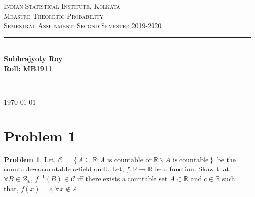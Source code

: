 \documentclass[12pt]{article}
\newcommand{\R}{\mathbb{R}}
\newcommand{\HRule}{\rule{\linewidth}{0.5mm}} %
\theoremstyle{definition}
\newtheorem*{prb}{Problem}
\newenvironment{problem}{
\begin{tcolorbox}[colback=blue!5!white,colframe=blue!75!black, parbox = true] \begin{prb}  }{\end{prb}\end{tcolorbox} }
\begin{document}
\begin{titlepage}
    
\centering
\textsc{\LARGE Indian Statistical Institute, Kolkata}\\[1.5cm] %
\textsc{\Large Measure Theoretic Probability}\\[0.5cm] %
\textsc{\large Semestral Assignment: Second Semester 2019-2020}\\[0.5cm] %

\HRule \\[0.4cm]
\large \textbf{Subhrajyoty Roy}\\
\large \textbf{Roll:  MB1911}\\
\HRule \\[1.5cm]
\normalsize \today

\end{titlepage}


\tableofcontents
\clearpage



\section{Problem 1}

\begin{problem}
	Let, $\mathcal{C} = \left\{ A \subseteq \R : A \text{ is countable or } \R \backslash A \text{ is countable} \right\}$ be the countable-cocountable $\sigma$-field on $\R$. Let, $f : \R \rightarrow \R$ be a function. Show that, $\forall B \in \mathcal{B}_{\R}$, $f^{-1}(B) \in \mathcal{C}$ iff there exists a countable set $A \subset \R$ and $c \in \R$ such that, $f(x) = c, \forall x \notin A$. 
\end{problem}
\end{document}
